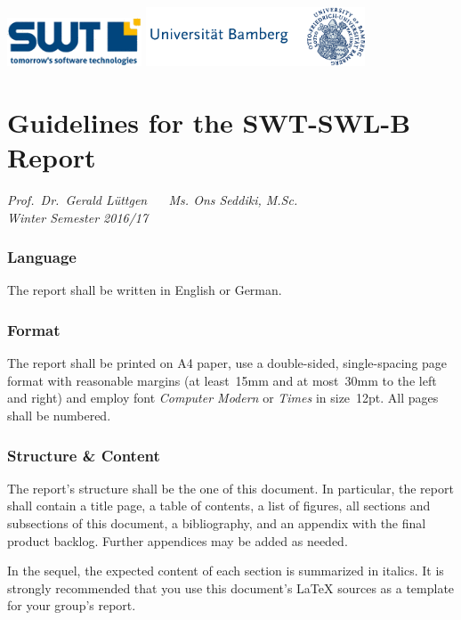 \pagestyle{empty} %
\includegraphics[width=4cm]{logo}\hfill
\includegraphics[width=6.5cm]{uni-bamberg-logo-de}\\
\section*{\centering Guidelines for the SWT-SWL-B Report}
\centering\emph{Prof.\ Dr.\ Gerald Lüttgen ~\textperiodcentered~  Ms. Ons 
Seddiki, M.Sc. \\ Winter Semester 2016/17}

\vfill
\flushleft
\subsubsection*{Language}
The report shall be written in English or German.

\subsubsection*{Format}

The report shall be printed on A4 paper, use a double-sided, single-spacing page format with reasonable margins (at least~15mm and at most~30mm to the left and right) and employ font \emph{Computer Modern} or \emph{Times} in size~12pt. All pages shall be numbered.

\subsubsection*{Structure \& Content}
The report's structure shall be the one of this document. In particular, the report shall contain a title page, a table of contents, a list of figures, all sections and subsections of this document, a bibliography, and an appendix with the final product backlog.  Further appendices may be added as needed.

In the sequel, the expected content of each section is summarized in italics.  It is strongly recommended that you use this document's {\LaTeX} sources as a template for your group's report.

